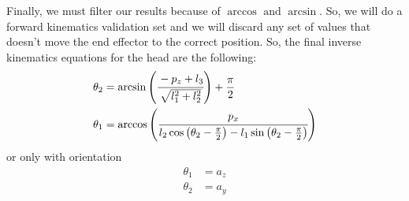 Finally, we must filter our results because of $\arccos\text{ and }\arcsin$. So, we will do a forward kinematics validation set and we will discard any set of values that doesn't move the end effector to the correct position.
So, the final inverse kinematics equations for the head are the following:
\begin{align*}
\theta_2 &= \arcsin\left(\cfrac{- p_z + l_3}{ \sqrt{l^2_1 + l^2_2} }\right) + \frac{\pi}{2}\\
\theta_1 &= \arccos\left(\cfrac{p_x}{l_2\cos\left(\theta_2 - \frac{\pi}{2}\right) - l_1\sin\left(\theta_2 - \frac{\pi}{2}\right) } \right)
\end{align*}
or only with orientation
\begin{align*}
\theta_1 &= a_z\\
\theta_2 &= a_y
\end{align*}

